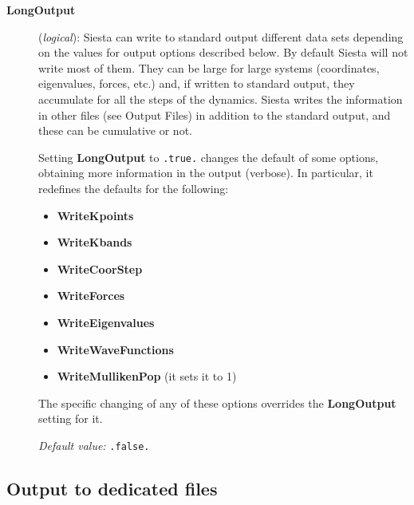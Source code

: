 \documentclass[11pt]{article}
\begin{document}
\begin{description}

\item[{\bf LongOutput}] ({\it logical}):
{\sc Siesta} can write to standard output different data sets
depending on the values for output options described below.
By default {\sc Siesta} will not write most of them. They can be
large for large systems (coordinates, eigenvalues, forces, etc.)
and, if written to standard output, they accumulate for all the steps of
the dynamics. {\sc Siesta} writes the information in other files
(see Output Files) in addition to the standard output, and these
can be cumulative or not.

Setting {\bf LongOutput} to {\tt .true.} changes the default of
some options, obtaining more information in the output (verbose).
In particular, it redefines the defaults for the following:

\begin{itemize}

\item
{\bf WriteKpoints}
\item
{\bf WriteKbands}
\item
{\bf WriteCoorStep}
\item
{\bf WriteForces}
\item
{\bf WriteEigenvalues}
\item
{\bf WriteWaveFunctions}
\item
{\bf WriteMullikenPop}
(it sets it to 1)
\end{itemize}

The specific changing of any of these options overrides the
{\bf LongOutput} setting for it.

{\it Default value:} {\tt .false.}

\end{description}

\subsection{Output to dedicated files} 
\end{document}
